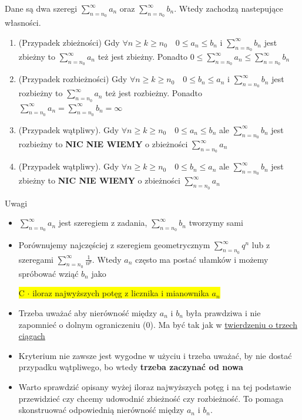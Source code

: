 Dane są dwa szeregi $ \sum\limits_{n = n_0}^{\infty} a_n $ oraz $ \sum\limits_{n = n_0}^{\infty} b_n $. Wtedy zachodzą nastepujące
własności.

\begin{enumerate}
    \item (Przypadek zbieżności) Gdy $ \forall n \geq k \geq n_0 \quad 0 \leq a_n \leq b_n $ i $ \sum\limits_{n = n_0}^{\infty} b_n $
    jest zbieżny to $ \sum\limits_{n = n_0}^{\infty} a_n $ też jest zbieżny. Ponadto
    $ 0 \leq \sum\limits_{n = n_0}^{\infty} a_n \leq \sum\limits_{n = n_0}^{\infty} b_n $
    
    \item (Przypadek rozbieżności) Gdy $ \forall n \geq k \geq n_0 \quad 0 \leq b_n \leq a_n $ i $ \sum\limits_{n = n_0}^{\infty} b_n $
    jest rozbieżny to $ \sum\limits_{n = n_0}^{\infty} a_n $ też jest rozbieżny. Ponadto
    $ \sum\limits_{n = n_0}^{\infty} a_n = \sum\limits_{n = n_0}^{\infty} b_n = \infty $

    \item (Przypadek wątpliwy). Gdy $ \forall n \geq k \geq n_0 \quad 0 \leq a_n \leq b_n $ ale $ \sum\limits_{n = n_0}^{\infty} b_n $ jest
    rozbieżny to \textbf{NIC NIE WIEMY} o zbieżności $ \sum\limits_{n = n_0}^{\infty} a_n $

    \item (Przypadek wątpliwy). Gdy $ \forall n \geq k \geq n_0 \quad 0 \leq b_n \leq a_n $ ale $ \sum\limits_{n = n_0}^{\infty} b_n $ jest
    zbieżny to \textbf{NIC NIE WIEMY} o zbieżności $ \sum\limits_{n = n_0}^{\infty} a_n $ \\
\end{enumerate}

Uwagi

\begin{itemize}
    \item $ \sum\limits_{n = n_0}^{\infty} a_n $ jest szeregiem z zadania, $ \sum\limits_{n = n_0}^{\infty} b_n $ tworzymy sami
    \item Porównujemy najczęściej z szeregiem geometrycznym $ \sum\limits_{n = n_0}^{\infty} q^n $ lub z szeregami
    $ \sum\limits_{n = n_0}^{\infty} \frac{1}{n^p} $. Wtedy $a_n$ często ma postać ułamków i możemy spróbować wziąć $b_n$ jako

    \quad \colorbox{yellow}{C $\cdot$ iloraz najwyższych potęg z licznika i mianownika $a_n$} 

    \item Trzeba uważać aby nierówność między $a_n$ i $b_n$ była prawdziwa i nie zapomnieć o dolnym ograniczeniu (0). Ma być
    tak jak w \underline{twierdzeniu o trzech ciągach}

    \item Kryterium nie zawsze jest wygodne w użyciu i trzeba uważać, by nie dostać przypadku wątpliwego, bo wtedy \textbf{trzeba zaczynać od nowa}
    
    \item Warto sprawdzić opisany wyżej iloraz najwyższych potęg i na tej podstawie przewidzieć czy chcemy udowodnić zbieżność
    czy rozbieżność. To pomaga skonstruować odpowiednią nierówność między $a_n$ i $b_n$.
\end{itemize}

